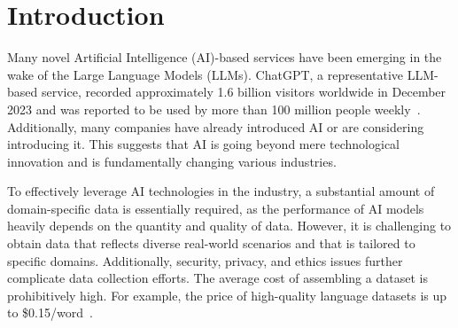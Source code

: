 \section{Introduction}
\label{sec:intro}


Many novel Artificial Intelligence (AI)-based services have been emerging in the
wake of the Large Language Models (LLMs). ChatGPT, a representative LLM-based
service, recorded approximately 1.6 billion visitors worldwide in December 2023
and was reported to be used by more than 100 million people
weekly~\cite{chatgpt, chatgptuser}. Additionally, many companies have already
introduced AI or are considering introducing it. This suggests that AI is going
beyond mere technological innovation and is fundamentally changing various
industries.

To effectively leverage AI technologies in the industry, a substantial amount of
domain-specific data is essentially required, 
as the performance of AI models heavily
depends on the quantity and quality of data.
However, it is challenging to obtain data that reflects diverse
real-world scenarios and that is tailored to specific domains. 
Additionally, security, privacy, and ethics issues further 
complicate data collection efforts. The average
cost of assembling a dataset is prohibitively high.
For example, the price of high-quality language
datasets is up to \$0.15/word~\cite{datasetprice}.

